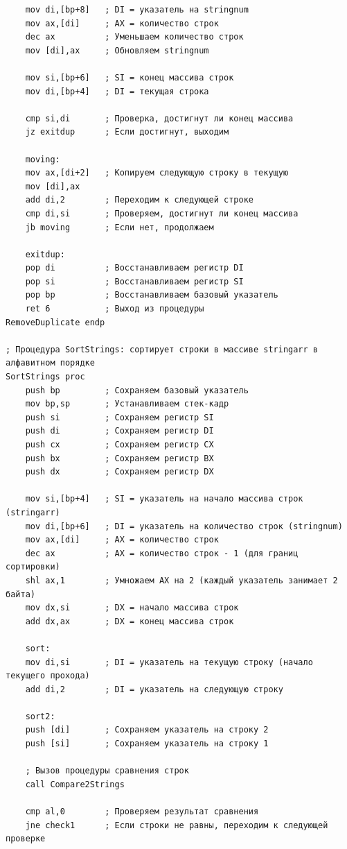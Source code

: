 \documentclass[a4paper,14pt]{article}
\begin{document}
\begin{lstlisting}
    mov di,[bp+8]   ; DI = указатель на stringnum
    mov ax,[di]     ; AX = количество строк
    dec ax          ; Уменьшаем количество строк
    mov [di],ax     ; Обновляем stringnum

    mov si,[bp+6]   ; SI = конец массива строк
    mov di,[bp+4]   ; DI = текущая строка

    cmp si,di       ; Проверка, достигнут ли конец массива       
    jz exitdup      ; Если достигнут, выходим

    moving:           
    mov ax,[di+2]   ; Копируем следующую строку в текущую
    mov [di],ax
    add di,2        ; Переходим к следующей строке
    cmp di,si       ; Проверяем, достигнут ли конец массива
    jb moving       ; Если нет, продолжаем

    exitdup:
    pop di          ; Восстанавливаем регистр DI
    pop si          ; Восстанавливаем регистр SI
    pop bp          ; Восстанавливаем базовый указатель
    ret 6           ; Выход из процедуры
RemoveDuplicate endp
    
; Процедура SortStrings: сортирует строки в массиве stringarr в алфавитном порядке
SortStrings proc
    push bp         ; Сохраняем базовый указатель
    mov bp,sp       ; Устанавливаем стек-кадр
    push si         ; Сохраняем регистр SI
    push di         ; Сохраняем регистр DI
    push cx         ; Сохраняем регистр CX
    push bx         ; Сохраняем регистр BX
    push dx         ; Сохраняем регистр DX

    mov si,[bp+4]   ; SI = указатель на начало массива строк (stringarr)
    mov di,[bp+6]   ; DI = указатель на количество строк (stringnum)
    mov ax,[di]     ; AX = количество строк 
    dec ax          ; AX = количество строк - 1 (для границ сортировки)
    shl ax,1        ; Умножаем AX на 2 (каждый указатель занимает 2 байта)
    mov dx,si       ; DX = начало массива строк
    add dx,ax       ; DX = конец массива строк

    sort:
    mov di,si       ; DI = указатель на текущую строку (начало текущего прохода)
    add di,2        ; DI = указатель на следующую строку

    sort2:
    push [di]       ; Сохраняем указатель на строку 2
    push [si]       ; Сохраняем указатель на строку 1

    ; Вызов процедуры сравнения строк
    call Compare2Strings

    cmp al,0        ; Проверяем результат сравнения
    jne check1      ; Если строки не равны, переходим к следующей проверке


\end{lstlisting}
\end{document}
